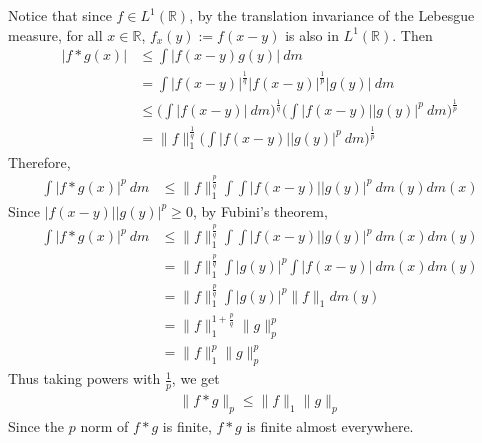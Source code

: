 \documentclass[12pt]{exam}
\theoremstyle{plain} %
\theoremstyle{definition} %
\theoremstyle{remark} %
\begin{document}
\begin{questions}
  \question
  \begin{solution}
    Notice that since $f \in L^{1}(\mathbb{R})$, by the translation
    invariance of the Lebesgue measure, for all $x \in \mathbb{R}$,
    $f_x(y):= f(x - y)$ is also in $L^{1}(\mathbb{R})$.
    Then
    \begin{align*}
      |f*g(x)| &\le \int |f(x-y) g(y)| \ d m \\
      &= \int  |f(x-y)|^{\frac{1}{q}}
      |f(x-y)|^{\frac{1}{p}} |g(y)|\ d m \\
      & \le \Big( \int |f(x-y)| \ d m\Big)^{\frac{1}{q}} \Big( \int
      |f(x-y)||g(y)|^{p} \ d m\Big)^{\frac{1}{p}} \\
      &= \|f\|_1^{\frac{1}{q}} \Big( \int
      |f(x-y)||g(y)|^{p} \ d m\Big)^{\frac{1}{p}}
    \end{align*}
    Therefore,
    \begin{align*}
      \int |f*g(x)|^p \ d m &\le \|f\|_1^{\frac{p}{q}} \int \int
      |f(x-y)||g(y)|^{p} \ dm(y) dm(x)
    \end{align*}
    Since $|f(x-y)||g(y)|^p \ge 0$, by Fubini's theorem,
    \begin{align*}
      \int |f*g(x)|^p \ d m &\le \|f\|_1^{\frac{p}{q}} \int \int
      |f(x-y)||g(y)|^{p} \ dm(x) dm(y) \\
      &= \|f\|_1^{\frac{p}{q}}\int |g(y)|^{p}\int |f(x-y)| \ dm(x) dm(y) \\
      &= \|f\|_1^{\frac{p}{q}}\int |g(y)|^p \|f\|_1 dm(y) \\
      &= \|f\|_1^{1 + \frac{p}{q}}\|g\|_p^{p} \\
      &= \|f\|_1^{p} \|g\|_p^p
    \end{align*}
    Thus taking powers with $\frac{1}{p}$, we get
    \begin{align*}
      \|f * g\|_p \le \|f\|_1 \|g\|_p
    \end{align*}
    Since the $p$ norm of $f*g$ is finite, $f*g$ is finite almost everywhere.
  \end{solution}


\end{questions}
\end{document}
